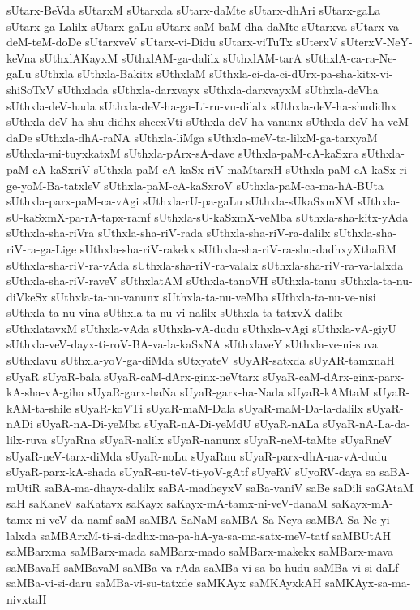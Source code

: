 {sUtarx-BeVda
sUtarxM
sUtarxda
sUtarx-daMte
sUtarx-dhAri
sUtarx-gaLa
sUtarx-ga-Lalilx
sUtarx-gaLu
sUtarx-saM-baM-dha-daMte
sUtarxva
sUtarx-va-deM-teM-doDe
sUtarxveV
sUtarx-vi-Didu
sUtarx-viTuTx
sUterxV
sUterxV-NeY-keVna
sUthxlAKayxM
sUthxlAM-ga-dalilx
sUthxlAM-tarA
sUthxlA-ca-ra-Ne-gaLu
sUthxla
sUthxla-Bakitx
sUthxlaM
sUthxla-ci-da-ci-dUrx-pa-sha-kitx-vi-shiSoTxV
sUthxlada
sUthxla-darxvayx
sUthxla-darxvayxM
sUthxla-deVha
sUthxla-deV-hada
sUthxla-deV-ha-ga-Li-ru-vu-dilalx
sUthxla-deV-ha-shudidhx
sUthxla-deV-ha-shu-didhx-shecxVti
sUthxla-deV-ha-vanunx
sUthxla-deV-ha-veM-daDe
sUthxla-dhA-raNA
sUthxla-liMga
sUthxla-meV-ta-lilxM-ga-tarxyaM
sUthxla-mi-tuyxkatxM
sUthxla-pArx-sA-dave
sUthxla-paM-cA-kaSxra
sUthxla-paM-cA-kaSxriV
sUthxla-paM-cA-kaSx-riV-maMtarxH
sUthxla-paM-cA-kaSx-ri-ge-yoM-Ba-tatxleV
sUthxla-paM-cA-kaSxroV
sUthxla-paM-ca-ma-hA-BUta
sUthxla-parx-paM-ca-vAgi
sUthxla-rU-pa-gaLu
sUthxla-sUkaSxmXM
sUthxla-sU-kaSxmX-pa-rA-tapx-ramf
sUthxla-sU-kaSxmX-veMba
sUthxla-sha-kitx-yAda
sUthxla-sha-riVra
sUthxla-sha-riV-rada
sUthxla-sha-riV-ra-dalilx
sUthxla-sha-riV-ra-ga-Lige
sUthxla-sha-riV-rakekx
sUthxla-sha-riV-ra-shu-dadhxyXthaRM
sUthxla-sha-riV-ra-vAda
sUthxla-sha-riV-ra-valalx
sUthxla-sha-riV-ra-va-lalxda
sUthxla-sha-riV-raveV
sUthxlatAM
sUthxla-tanoVH
sUthxla-tanu
sUthxla-ta-nu-diVkeSx
sUthxla-ta-nu-vanunx
sUthxla-ta-nu-veMba
sUthxla-ta-nu-ve-nisi
sUthxla-ta-nu-vina
sUthxla-ta-nu-vi-nalilx
sUthxla-ta-tatxvX-dalilx
sUthxlatavxM
sUthxla-vAda
sUthxla-vA-dudu
sUthxla-vAgi
sUthxla-vA-giyU
sUthxla-veV-dayx-ti-roV-BA-va-la-kaSxNA
sUthxlaveY
sUthxla-ve-ni-suva
sUthxlavu
sUthxla-yoV-ga-diMda
sUtxyateV
sUyAR-satxda
sUyAR-tamxnaH
sUyaR
sUyaR-bala
sUyaR-caM-dArx-ginx-neVtarx
sUyaR-caM-dArx-ginx-parx-kA-sha-vA-giha
sUyaR-garx-haNa
sUyaR-garx-ha-Nada
sUyaR-kAMtaM
sUyaR-kAM-ta-shile
sUyaR-koVTi
sUyaR-maM-Dala
sUyaR-maM-Da-la-dalilx
sUyaR-nADi
sUyaR-nA-Di-yeMba
sUyaR-nA-Di-yeMdU
sUyaR-nALa
sUyaR-nA-La-da-lilx-ruva
sUyaRna
sUyaR-nalilx
sUyaR-nanunx
sUyaR-neM-taMte
sUyaRneV
sUyaR-neV-tarx-diMda
sUyaR-noLu
sUyaRnu
sUyaR-parx-dhA-na-vA-dudu
sUyaR-parx-kA-shada
sUyaR-su-teV-ti-yoV-gAtf
sUyeRV
sUyoRV-daya
sa
saBA-mUtiR
saBA-ma-dhayx-dalilx
saBA-madheyxV
saBa-vaniV
saBe
saDili
saGAtaM
saH
saKaneV
saKatavx
saKayx
saKayx-mA-tamx-ni-veV-danaM
saKayx-mA-tamx-ni-veV-da-namf
saM
saMBA-SaNaM
saMBA-Sa-Neya
saMBA-Sa-Ne-yi-lalxda
saMBArxM-ti-si-dadhx-ma-pa-hA-ya-sa-ma-satx-meV-tatf
saMBUtAH
saMBarxma
saMBarx-mada
saMBarx-mado
saMBarx-makekx
saMBarx-mava
saMBavaH
saMBavaM
saMBa-va-rAda
saMBa-vi-sa-ba-hudu
saMBa-vi-si-daLf
saMBa-vi-si-daru
saMBa-vi-su-tatxde
saMKAyx
saMKAyxkAH
saMKAyx-sa-ma-nivxtaH
}
